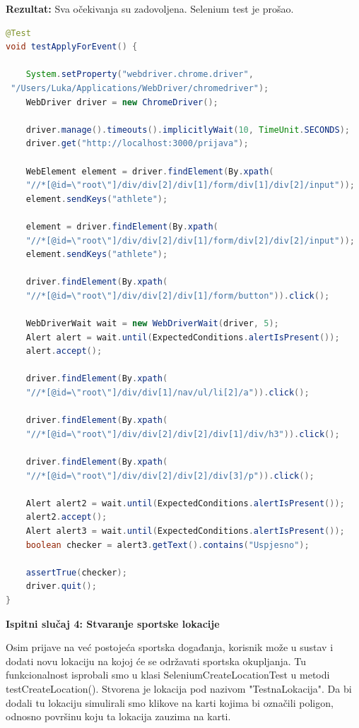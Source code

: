 		\noindent\textbf{Rezultat:} Sva očekivanja su zadovoljena. Selenium test je prošao.
		
		\begin{lstlisting}[language=Java,caption={testApplyForEvent},label=DescriptiveLabel]
@Test
void testApplyForEvent() {

	System.setProperty("webdriver.chrome.driver",
 "/Users/Luka/Applications/WebDriver/chromedriver");
	WebDriver driver = new ChromeDriver();

	driver.manage().timeouts().implicitlyWait(10, TimeUnit.SECONDS);
	driver.get("http://localhost:3000/prijava");

	WebElement element = driver.findElement(By.xpath(
	"//*[@id=\"root\"]/div/div[2]/div[1]/form/div[1]/div[2]/input"));        
	element.sendKeys("athlete");

	element = driver.findElement(By.xpath(
	"//*[@id=\"root\"]/div/div[2]/div[1]/form/div[2]/div[2]/input"));
	element.sendKeys("athlete");

	driver.findElement(By.xpath(
	"//*[@id=\"root\"]/div/div[2]/div[1]/form/button")).click();

	WebDriverWait wait = new WebDriverWait(driver, 5);
	Alert alert = wait.until(ExpectedConditions.alertIsPresent());
	alert.accept();

	driver.findElement(By.xpath(
	"//*[@id=\"root\"]/div/div[1]/nav/ul/li[2]/a")).click();
	
	driver.findElement(By.xpath(
	"//*[@id=\"root\"]/div/div[2]/div[2]/div[1]/div/h3")).click();
	
	driver.findElement(By.xpath(
	"//*[@id=\"root\"]/div/div[2]/div[2]/div[3]/p")).click();

	Alert alert2 = wait.until(ExpectedConditions.alertIsPresent());
	alert2.accept();
	Alert alert3 = wait.until(ExpectedConditions.alertIsPresent());
	boolean checker = alert3.getText().contains("Uspjesno");

	assertTrue(checker);
	driver.quit();
}

		\end{lstlisting}
		
		\hfill\break
		\noindent\textbf{Ispitni slučaj 4: Stvaranje sportske lokacije}
		
		Osim prijave na već postojeća sportska događanja, korisnik može u sustav i dodati novu lokaciju na kojoj će se održavati sportska okupljanja.
		Tu funkcionalnost isprobali smo u klasi SeleniumCreateLocationTest u metodi testCreateLocation().
		Stvorena je lokacija pod nazivom "TestnaLokacija".
		Da bi dodali tu lokaciju simulirali smo klikove na karti kojima bi označili poligon, odnosno površinu koju ta lokacija zauzima na karti.
		
